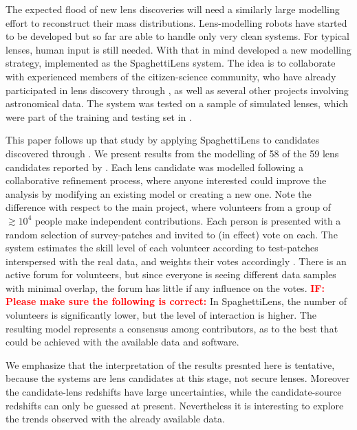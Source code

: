 The expected flood of new lens discoveries will need a similarly large
modelling effort to reconstruct their mass distributions.
Lens-modelling robots have started to be developed
\citep{2017arXiv170807377N,2017arXiv170808842H} but so far are able to
handle only very clean systems.  For typical lenses, human input is
still needed.  With that in mind \cite{2015MNRAS.447.2170K} developed
a new modelling strategy, implemented as the SpaghettiLens system.
The idea is to collaborate with experienced members of the
citizen-science community, who have already participated in lens
discovery through \SW, as well as several other projects involving
astronomical data.  The system was tested on a sample of simulated
lenses, which were part of the training and testing set in \SW.

This paper follows up that study by applying SpaghettiLens to
candidates discovered through \SW.  We present results from
the modelling of 58 of the 59 lens candidates reported by
\cite{2016MNRAS.455.1191M}.  Each lens candidate was modelled
following a collaborative refinement process, where anyone interested
could improve the analysis by modifying an existing model or creating
a new one. Note the difference with respect to the main \SW 
project, where volunteers from a group of $\gtrsim10^4$ people make
independent contributions.  Each person is presented with a random
selection of survey-patches and invited to (in effect) vote on each.
The system estimates the skill level of each volunteer according to
test-patches interspersed with the real data, and weights their votes
accordingly \citep{2016MNRAS.455.1171M}.  There is an active forum for
volunteers, but since everyone is seeing different data samples with
minimal overlap, the forum has little if any influence on the votes.
\textcolor{red}{\bf IF: Please make sure the following is correct:}
In SpaghettiLens, the number of volunteers is significantly lower, but
the level of interaction is higher.  The resulting model represents a
consensus among contributors, as to the best that could be achieved
with the available data and software.

We emphasize that the interpretation of the results presnted here is
tentative, because the systems are lens candidates at this stage, not
secure lenses.  Moreover the candidate-lens redshifts have large
uncertainties, while the candidate-source redshifts can only be
guessed at present.  Nevertheless it is interesting to explore the
trends observed with the already available data.

